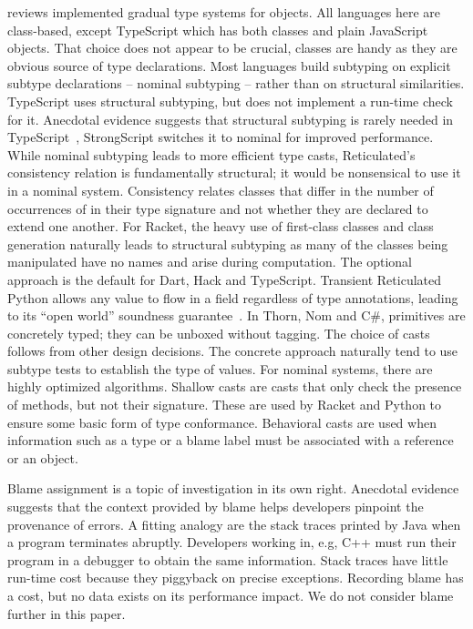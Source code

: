 \documentclass[USenglish]{tex/lipics-v2016}
\begin{document}
 reviews implemented gradual type systems for objects.  All
languages here are class-based, except TypeScript which has both classes and
plain JavaScript objects. That choice does not appear to be crucial, classes
are handy as they are obvious source of type declarations.  Most languages build
subtyping on explicit subtype declarations -- nominal subtyping -- rather
than on structural similarities.  TypeScript uses structural subtyping, but
does not implement a run-time check for it.  Anecdotal evidence suggests
that structural subtyping is rarely needed in TypeScript~\cite{ecoop15},
Strong\-Script switches it to nominal for improved performance. While
nominal subtyping leads to more efficient type casts, Reticulated's
consistency relation is fundamentally structural; it would be nonsensical to
use it in a nominal system. Consistency relates classes that differ in the
number of occurrences of \any in their type signature and not whether they
are declared to extend one another.  For Racket, the heavy use of
first-class classes and class generation naturally leads to structural
subtyping as many of the classes being manipulated have no names and arise
during computation.
The optional approach is the default for Dart, Hack and TypeScript.
Transient Reticulated Python allows any value to flow in a field regardless
of type annotations, leading to its ``open world'' soundness
guarantee~\cite{siek14}.  In Thorn, Nom and C\#, primitives are concretely
typed; they can be unboxed without tagging.  The choice of casts follows
from other design decisions. The concrete approach naturally tend to use
subtype tests to establish the type of values. For nominal systems, there
are highly optimized algorithms. Shallow casts are casts that only check the
presence of methods, but not their signature. These are used by Racket and
Python to ensure some basic form of type conformance.  Behavioral casts are
used when information such as a type or a blame label must be associated
with a reference or an object.

Blame assignment is a topic of investigation in its own right. Anecdotal
evidence suggests that the context provided by blame helps developers
pinpoint the provenance of errors. A fitting analogy are the stack traces
printed by Java when a program terminates abruptly. Developers working in,
e.g, C++ must run their program in a debugger to obtain the same
information. Stack traces have little run-time cost because they piggyback on
precise exceptions. Recording blame has a cost, but no data exists on its
performance impact. We do not consider blame further in this paper.
\end{document}
